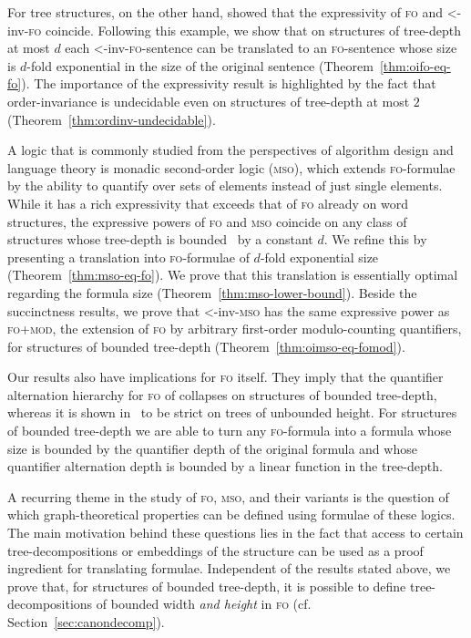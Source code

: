 \documentclass[11pt]{article}
\newcommand{\logic}[1]{\textsc{#1}}
\newcommand{\FO}{\logic{fo}}
\newcommand{\FOmod}{\logic{fo+mod}}
\newcommand{\MSO}{\logic{mso}}
\newcommand{\ordinv}[1]{\textnormal{{\small \textless}-inv-}#1}
\newcommand{\oiFO}{\ordinv{\FO{}}}
\newcommand{\oiMSO}{\ordinv{\MSO{}}}
\begin{document}
For tree structures, on the other hand, \cite{BenediktSegoufin2009} showed that
the expressivity of \FO{} and \oiFO{} coincide. Following this example, 
we show that on structures of tree-depth at most $d$ each \oiFO{}-sentence can be translated to an \FO{}-sentence
whose size is $d$-fold exponential in the size of the original sentence (Theorem~\ref{thm:oifo-eq-fo}). The importance of the expressivity result is
highlighted by the fact that order-invariance is undecidable even on structures
of tree-depth at most $2$ (Theorem~\ref{thm:ordinv-undecidable}). 

A logic that is commonly studied from the perspectives of algorithm design and
language theory is monadic second-order logic (\MSO{}), which extends
\FO{}-formulae by the ability to quantify over sets of elements instead of just
single elements. While it has a rich expressivity that exceeds that of \FO{}
already on word structures, the expressive powers of \FO{} and \MSO{} coincide
on any class of structures whose tree-depth is bounded~\cite{ElberfeldGT12} by a constant $d$. We
refine this by presenting a translation into \FO{}-formulae of $d$-fold exponential size
(Theorem~\ref{thm:mso-eq-fo}). We prove that this translation is essentially optimal regarding the formula size
(Theorem~\ref{thm:mso-lower-bound}).
Beside the succinctness results, we prove that \oiMSO{} has the same
expressive power as \FOmod{}, the extension of \FO{} by arbitrary
first-order modulo-counting quantifiers, for structures of bounded tree-depth (Theorem~\ref{thm:oimso-eq-fomod}). 

Our results also have implications for \FO{} itself. They imply that the
quantifier alternation hierarchy for \FO{} of \cite{ChandraH1982} collapses on
structures of bounded tree-depth, whereas it is shown in~\cite{ChandraH1982} to
be strict on trees of unbounded height. For structures of bounded tree-depth we
are able to turn any \FO-formula into a formula whose size is bounded by the
quantifier depth of the original formula and whose quantifier alternation depth
is bounded by a linear function in the tree-depth.

A recurring theme in the study of \FO{}, \MSO{}, and their variants is the
question of which graph-theoretical properties can be defined using formulae of
these logics. The main motivation behind these questions lies in the fact that
access to certain tree-decompositions or embeddings of the structure can be used
as a proof ingredient for translating formulae. Independent of the results
stated above, we prove that, for structures of bounded tree-depth, it is
possible to define tree-decompositions of bounded width \emph{and height} in
\FO{} (cf. Section~\ref{sec:canondecomp}).
\end{document}
